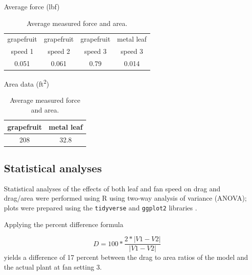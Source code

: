 \documentclass[]{article}
\begin{document}
\begin{table}

\caption{Average measured force and area.}

\label{tbl:results1}
\begin{center}
Average force (\si{lbf})\\
\begin{tabular}{cccc}
\toprule
grapefruit & grapefruit & grapefruit & metal leaf \\
speed 1 & speed 2 & speed 3 & speed 3 \\
\midrule
0.051 & 0.061 & 0.79 & 0.014\\
\bottomrule
\end{tabular}
\end{center}
\begin{center}
Area data (\si{ft\squared})\\
\begin{tabular}{cc}
\toprule
grapefruit & metal leaf \\
\midrule
208 & 32.8 \\
\bottomrule
\end{tabular}
\end{center}
\end{table}

\subsection{Statistical analyses}
Statistical analyses of the effects of both leaf and fan speed on drag and drag/area were performed using R \citep{r2020} using two-way analysis of variance (ANOVA); plots were prepared using the \lstinline{tidyverse} and \lstinline{ggplot2} libraries \citep{wickham2019tidyverse}.

Applying the percent difference formula

\[D=100*\frac{2*|V1-V2|}{|V1-V2|}\]
yields a difference of 17 percent between the drag to area ratios of the model and the actual plant at fan setting 3. 
\end{document}
